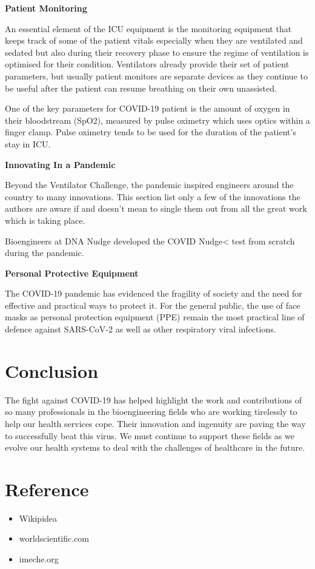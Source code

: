 \documentclass[12pt]{article}
\begin{document}
\hspace{3cm}


\textbf{Patient Monitoring}


\hspace{2cm}


An essential element of the ICU equipment is the monitoring equipment that keeps track of some of the patient vitals especially when they are ventilated and sedated but also during their recovery phase to ensure the regime of ventilation is optimised for their condition. Ventilators already provide their set of patient parameters, but usually patient monitors are separate devices as they continue to be useful after the patient can resume breathing on their own unassisted.

One of the key parameters for COVID-19 patient is the amount of oxygen in their bloodstream (SpO2), measured by pulse oximetry which uses optics within a finger clamp. Pulse oximetry tends to be used for the duration of the patient’s stay in ICU.


\hspace{3cm}


\textbf{Innovating In a Pandemic}


\hspace{2cm}


Beyond the Ventilator Challenge, the pandemic inspired engineers around the country to many innovations. This section list only a few of the innovations the authors are aware if and doesn’t mean to single them out from all the great work which is taking place.

Bioengineers at DNA Nudge developed the COVID Nudge< test from scratch during the pandemic.


\clearpage


\textbf{Personal Protective Equipment}


\hspace{2cm}


The COVID-19 pandemic has evidenced the fragility of society and the need for effective and practical ways to protect it. For the general public, the use of face masks as personal protection equipment (PPE) remain the most practical line of defence against SARS-CoV-2 as well as other respiratory viral infections.


\section{Conclusion}
\hspace{1cm}
The fight against COVID-19 has helped highlight the work and contributions of so many professionals in the bioengineering fields who are working tirelessly to help our health services cope. Their innovation and ingenuity are paving the way to successfully beat this virus. We must continue to support these fields as we evolve our health systems to deal with the challenges of healthcare in the future.
\section{Reference}
\begin{itemize}
\item Wikipidea
\item worldscientific.com
\item imeche.org
\end{itemize}
\end{document}
